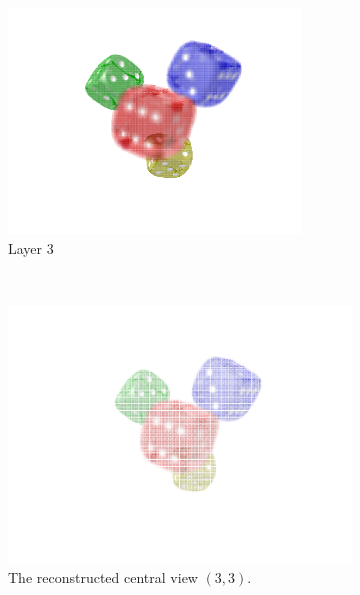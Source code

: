 \documentclass[11pt,a4paper,titlepage]{article}
\begin{document}
\begin{figure}[h]
\begin{subfigure}[c]{0.3\textwidth}
		\includegraphics[width=\textwidth]{results/dice_perspective_rec_3Layers_r=0/3.png}
		\caption{Layer 3}
	\end{subfigure}%
	\\
	\begin{subfigure}[t]{0.4\textwidth}
		\includegraphics[width=\textwidth]{results/dice_perspective_rec_3Layers_r=0/central_view_reconstruction3-3.png}
		\caption{The reconstructed central view $\left( 3, 3 \right)$.}
	\end{subfigure}%
	~
	\begin{subfigure}[t]{0.4\textwidth}

\end{subfigure}
\end{figure}
\end{document}
